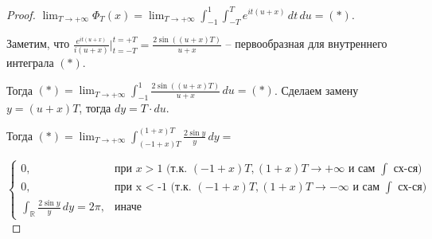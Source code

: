 \begin{proof}







    $\lim_{T \to +\infty} \Phi_T (x) = \lim_{T \to +\infty} \int_{-1}^1 \int_{-T}^T e^{it(u + x)} \, dt \, du = (*)$.

    Заметим, что $\frac{e^{it(u + x)}}{i(u + x)} \bigg |_{t = -T}^{t = +T} = \frac{2\sin ((u + x)T)}{u + x}$ -- первообразная для внутреннего интеграла $(*)$.

    Тогда $(*) = \lim_{T \to +\infty} \int_{-1}^1 \frac{2\sin ((u + x)T)}{u + x} \, du = (*)$. Сделаем замену $y = (u + x)T$, тогда $dy = T \cdot du$.

    Тогда $(*) = \lim_{T \to +\infty} \int_{(-1 + x)T}^{(1 + x)T} \frac{2 \sin y}{y} \, dy =$

    $\begin{cases}
        0, & \text{при $x > 1$ (т.к. $(-1 + x)T, (1 + x)T \to +\infty$ и сам $\int$ сх-ся)} \\
        0, & \text{при x < -1 (т.к. $(-1 + x)T, (1 + x)T \to -\infty$ и сам $\int$ сх-ся)} \\
        \int_{\mathbb{R}} \frac{2 \sin y}{y} \, dy = 2\pi, & \text{иначе}
    \end{cases}$


\end{proof}
